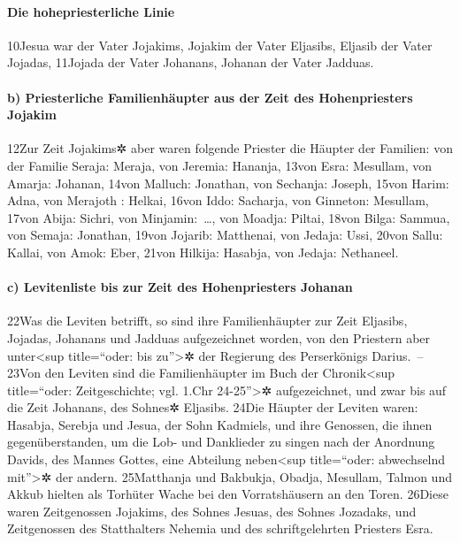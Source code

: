 \hypertarget{die-hohepriesterliche-linie}{%
\paragraph{Die hohepriesterliche
Linie}\label{die-hohepriesterliche-linie}}

10Jesua war der Vater Jojakims, Jojakim der Vater Eljasibs, Eljasib der
Vater Jojadas, 11Jojada der Vater Johanans, Johanan der Vater Jadduas.

\hypertarget{b-priesterliche-familienhuxe4upter-aus-der-zeit-des-hohenpriesters-jojakim}{%
\paragraph{b) Priesterliche Familienhäupter aus der Zeit des
Hohenpriesters
Jojakim}\label{b-priesterliche-familienhuxe4upter-aus-der-zeit-des-hohenpriesters-jojakim}}

12Zur Zeit Jojakims✲ aber waren folgende Priester die Häupter der
Familien: von der Familie Seraja: Meraja, von Jeremia: Hananja, 13von
Esra: Mesullam, von Amarja: Johanan, 14von Malluch: Jonathan, von
Sechanja: Joseph, 15von Harim: Adna, von Merajoth : Helkai, 16von Iddo:
Sacharja, von Ginneton: Mesullam, 17von Abija: Sichri, von
Minjamin:~\ldots, von Moadja: Piltai, 18von Bilga: Sammua, von Semaja:
Jonathan, 19von Jojarib: Matthenai, von Jedaja: Ussi, 20von Sallu:
Kallai, von Amok: Eber, 21von Hilkija: Hasabja, von Jedaja: Nethaneel.

\hypertarget{c-levitenliste-bis-zur-zeit-des-hohenpriesters-johanan}{%
\paragraph{c) Levitenliste bis zur Zeit des Hohenpriesters
Johanan}\label{c-levitenliste-bis-zur-zeit-des-hohenpriesters-johanan}}

22Was die Leviten betrifft, so sind ihre Familienhäupter zur Zeit
Eljasibs, Jojadas, Johanans und Jadduas aufgezeichnet worden, von den
Priestern aber unter\textless sup title=``oder: bis zu''\textgreater✲
der Regierung des Perserkönigs Darius.~-- 23Von den Leviten sind die
Familienhäupter im Buch der Chronik\textless sup title=``oder:
Zeitgeschichte; vgl. 1.Chr 24-25''\textgreater✲ aufgezeichnet, und zwar
bis auf die Zeit Johanans, des Sohnes✲ Eljasibs. 24Die Häupter der
Leviten waren: Hasabja, Serebja und Jesua, der Sohn Kadmiels, und ihre
Genossen, die ihnen gegenüberstanden, um die Lob- und Danklieder zu
singen nach der Anordnung Davids, des Mannes Gottes, eine Abteilung
neben\textless sup title=``oder: abwechselnd mit''\textgreater✲ der
andern. 25Matthanja und Bakbukja, Obadja, Mesullam, Talmon und Akkub
hielten als Torhüter Wache bei den Vorratshäusern an den Toren. 26Diese
waren Zeitgenossen Jojakims, des Sohnes Jesuas, des Sohnes Jozadaks, und
Zeitgenossen des Statthalters Nehemia und des schriftgelehrten Priesters
Esra.

